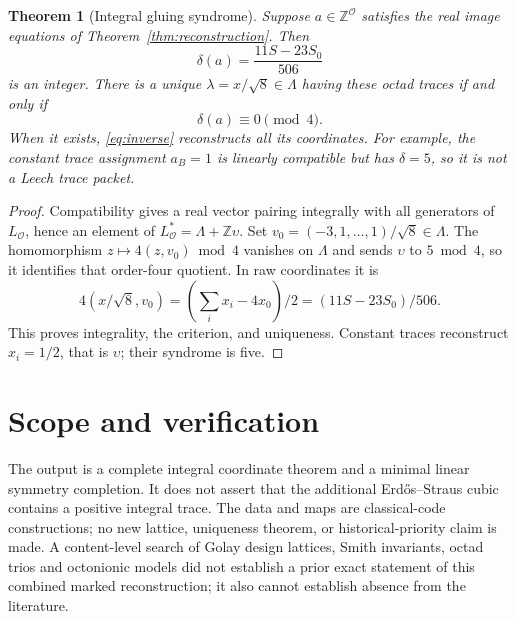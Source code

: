 \documentclass[10pt,reqno]{amsart}
\newtheorem{theorem}{Theorem}
\theoremstyle{remark}\newtheorem{remark}[theorem]{Remark}
\newcommand{\Z}{\mathbb Z}\newcommand{\Q}{\mathbb Q}\newcommand{\R}{\mathbb R}\newcommand{\F}{\mathbb F}
\newcommand{\La}{\Lambda}\newcommand{\tr}{\operatorname{tr}}
\begin{document}
\begin{theorem}[Integral gluing syndrome]\label{thm:syndrome}
Suppose $a\in\Z^{\mathcal O}$ satisfies the real image equations of Theorem~\ref{thm:reconstruction}. Then
\[
\delta(a)=\frac{11S-23S_0}{506}
\]
is an integer. There is a unique $\lambda=x/\sqrt8\in\La$ having these octad traces if and only if
\begin{equation}\label{eq:syndrome}
\boxed{\delta(a)\equiv0\pmod4.}
\end{equation}
When it exists, \eqref{eq:inverse} reconstructs all its coordinates. For example, the constant trace assignment $a_B=1$ is linearly compatible but has $\delta=5$, so it is not a Leech trace packet.
\end{theorem}
\begin{proof}
Compatibility gives a real vector pairing integrally with all generators of $L_{\mathcal O}$, hence an element of $L_{\mathcal O}^*=\La+\Z\upsilon$. Set $v_0=(-3,1,\ldots,1)/\sqrt8\in\La$. The homomorphism $z\mapsto4(z,v_0)\bmod4$ vanishes on $\La$ and sends $\upsilon$ to $5\bmod4$, so it identifies that order-four quotient. In raw coordinates it is
\[
4(x/\sqrt8,v_0)=(\sum_i x_i-4x_0)/2
=(11S-23S_0)/506.
\]
This proves integrality, the criterion, and uniqueness. Constant traces reconstruct $x_i=1/2$, that is $\upsilon$; their syndrome is five.
\end{proof}

\section{Scope and verification}
The output is a complete integral coordinate theorem and a minimal linear symmetry completion. It does not assert that the additional Erd\H{o}s--Straus cubic contains a positive integral trace. The data and maps are classical-code constructions; no new lattice, uniqueness theorem, or historical-priority claim is made. A content-level search of Golay design lattices, Smith invariants, octad trios and octonionic models did not establish a prior exact statement of this combined marked reconstruction; it also cannot establish absence from the literature.
\end{document}
